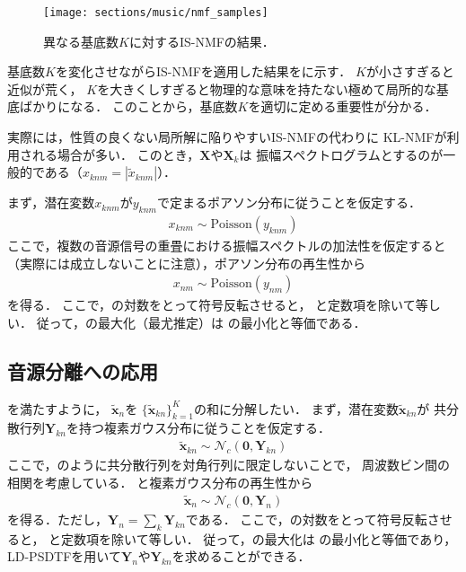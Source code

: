 \begin{figure}[t]
\centering
\texttt{[image: sections/music/nmf\_samples]}
\caption{異なる基底数$K$に対するIS-NMFの結果．}
\label{fig:nmf_samples}
\end{figure}

基底数$K$を変化させながらIS-NMFを適用した結果をに示す．
$K$が小さすぎると近似が荒く，
$K$を大きくしすぎると物理的な意味を持たない極めて局所的な基底ばかりになる．
このことから，基底数$K$を適切に定める重要性が分かる．

実際には，性質の良くない局所解に陥りやすいIS-NMFの代わりに
KL-NMFが利用される場合が多い．
このとき，$\bm{X}$や$\bm{X}_k$は
振幅スペクトログラムとするのが一般的である（$x_{knm} = |\tilde{x}_{knm}|$）．

まず，潜在変数$x_{knm}$が$y_{knm}$で定まるポアソン分布に従うことを仮定する．
\begin{align}
 x_{knm} \sim \mbox{Poisson}(y_{knm})
 \label{eqn:kl_s_k_p}
\end{align}
ここで，複数の音源信号の重畳における振幅スペクトルの加法性を仮定すると
（実際には成立しないことに注意），ポアソン分布の再生性から
\begin{align}
 x_{nm} \sim \mbox{Poisson}(y_{nm})
 \label{eqn:kl_s_p}
\end{align}
を得る．
ここで，の対数をとって符号反転させると，
と定数項を除いて等しい．
従って，の最大化（最尤推定）は
の最小化と等価である．


\subsection{音源分離への応用}
\label{sec:mf}

を満たすように，
$\tilde{\bm{x}}_n$を
$\{\tilde{\bm{x}}_{kn}\}_{k=1}^K$の和に分解したい．
まず，潜在変数$\tilde{\bm{x}}_{kn}$が
共分散行列$\bm{Y}_{kn}$を持つ複素ガウス分布に従うことを仮定する．
\begin{align}
 \tilde{\bm{x}}_{kn} \sim \mathcal{N}_c(\bm{0}, \bm{Y}_{kn})
 \label{eqn:ld_s_k_p}
\end{align}
ここで，のように共分散行列を対角行列に限定しないことで，
周波数ビン間の相関を考慮している．
と複素ガウス分布の再生性から
\begin{align}
 \tilde{\bm{x}}_n \sim \mathcal{N}_c(\bm{0}, \bm{Y}_n)
  \label{eqn:ld_s_p}
\end{align}
を得る．ただし，$\bm{Y}_n = \sum_k \bm{Y}_{kn}$である．
ここで，の対数をとって符号反転させると，
と定数項を除いて等しい．
従って，の最大化は
の最小化と等価であり，
LD-PSDTFを用いて$\bm{Y}_n$や$\bm{Y}_{kn}$を求めることができる．

